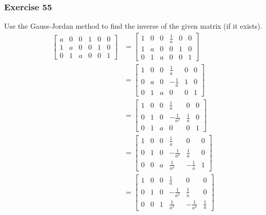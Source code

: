 \documentclass[letterpaper, 12pt]{math}
\begin{document}
\subsubsection*{Exercise 55}
Use the Gauss-Jordan method to find the inverse of the given matrix (if it
exists).
\begin{align*}
  \begin{bmatrix}
    a & 0 & 0 & 1 & 0 & 0 \\
    1 & a & 0 & 0 & 1 & 0 \\
    0 & 1 & a & 0 & 0 & 1
  \end{bmatrix} &= \begin{bmatrix}
    1 & 0 & 0 & \frac{1}{a} & 0 & 0 \\
    1 & a & 0 & 0 & 1 & 0 \\
    0 & 1 & a & 0 & 0 & 1
  \end{bmatrix} \\
  &= \begin{bmatrix}
    1 & 0 & 0 & \frac{1}{a} & 0 & 0 \\
    0 & a & 0 & -\frac{1}{a} & 1 & 0 \\
    0 & 1 & a & 0 & 0 & 1
  \end{bmatrix} \\
  &= \begin{bmatrix}
    1 & 0 & 0 & \frac{1}{a} & 0 & 0 \\
    0 & 1 & 0 & -\frac{1}{a^2} & \frac{1}{a} & 0 \\
    0 & 1 & a & 0 & 0 & 1
  \end{bmatrix} \\
  &= \begin{bmatrix}
    1 & 0 & 0 & \frac{1}{a} & 0 & 0 \\
    0 & 1 & 0 & -\frac{1}{a^2} & \frac{1}{a} & 0 \\
    0 & 0 & a & \frac{1}{a^2} & -\frac{1}{a} & 1
  \end{bmatrix} \\
  &= \begin{bmatrix}
    1 & 0 & 0 & \frac{1}{a} & 0 & 0 \\
    0 & 1 & 0 & -\frac{1}{a^2} & \frac{1}{a} & 0 \\
    0 & 0 & 1 & \frac{1}{a^3} & -\frac{1}{a^2} & \frac{1}{a}
  \end{bmatrix}
\end{align*}
\end{document}
